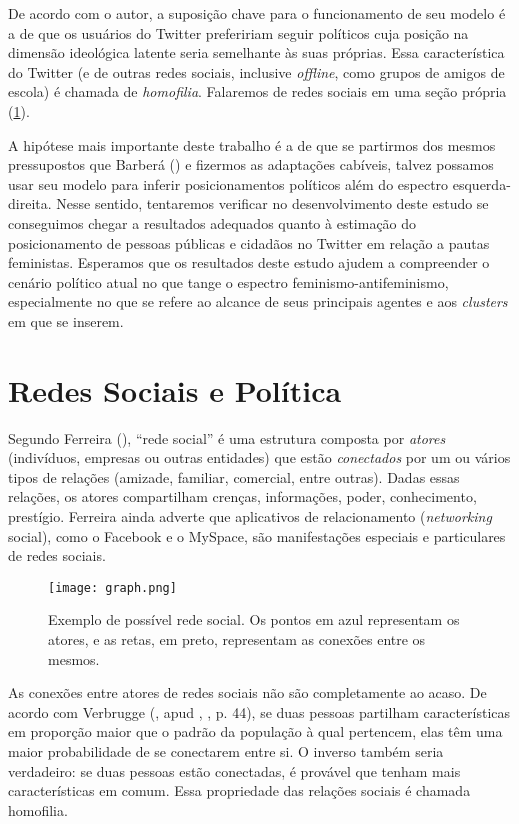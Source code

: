 \documentclass[
	12pt,				%
	openright,			%
	twoside,			%
	a4paper,			%
	english,			%
	brazil				%
	]{abntex2}
\begin{document}
 De acordo com o autor, a suposição chave para o funcionamento de seu modelo é a de que os usuários do Twitter prefeririam seguir políticos cuja posição na dimensão ideológica latente seria semelhante às suas próprias. Essa característica do Twitter (e de outras redes sociais, inclusive \emph{offline}, como grupos de amigos de escola) é chamada de \emph{homofilia}. Falaremos de redes sociais em uma seção própria (\ref{redessociais}).

 A hipótese mais importante deste trabalho é a de que se partirmos dos mesmos pressupostos que Barberá (\citeyear{barbera2015}) e fizermos as adaptações cabíveis, talvez possamos usar seu modelo para inferir posicionamentos políticos além do espectro esquerda-direita. Nesse sentido, tentaremos verificar no desenvolvimento deste estudo se conseguimos chegar a resultados adequados quanto à estimação do posicionamento de pessoas públicas e cidadãos no Twitter em relação a pautas feministas. Esperamos que os resultados deste estudo ajudem a compreender o cenário político atual no que tange o espectro feminismo-antifeminismo, especialmente no que se refere ao alcance de seus principais agentes e aos \emph{clusters} em que se inserem.
 
 \section{Redes Sociais e Política}\label{redessociais}
 
 Segundo Ferreira (\citeyear{ferreira2011}), ``rede social'' é uma estrutura composta por \emph{atores} (indivíduos, empresas ou outras entidades) que estão \emph{conectados} por um ou vários tipos de relações (amizade, familiar, comercial, entre outras). Dadas essas relações, os atores compartilham crenças, informações, poder, conhecimento, prestígio. Ferreira ainda adverte que aplicativos de relacionamento (\emph{networking} social), como o Facebook e o MySpace, são manifestações especiais e particulares de redes sociais.
 
 \begin{figure}[!htbp]
    \centering
    \texttt{[image: graph.png]}
    \caption{Exemplo de possível rede social. Os pontos em azul representam os atores, e as retas, em preto, representam as conexões entre os mesmos.}
    \label{fig:redesocial}
 \end{figure}
 
 As conexões entre atores de redes sociais não são completamente ao acaso. De acordo com Verbrugge (\citeyear{verbrugge1977}, apud , \citeyear{kadushin2013}, p. 44), se duas pessoas partilham características em proporção maior que o padrão da população à qual pertencem, elas têm uma maior probabilidade de se conectarem entre si. O inverso também seria verdadeiro: se duas pessoas estão conectadas, é provável que tenham mais características em comum. Essa propriedade das relações sociais é chamada homofilia.
\end{document}

